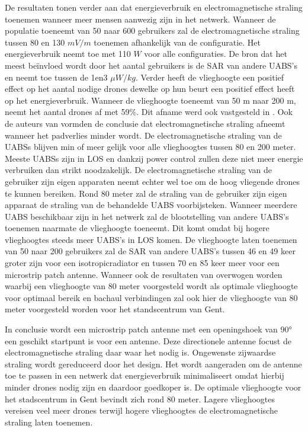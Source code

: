 \documentclass[twocolumn]{phdsymp_dutch}
\begin{document}
De resultaten tonen verder aan dat energieverbruik en electromagnetische straling toenemen wanneer 
meer mensen aanwezig zijn in het netwerk. Wanneer de populatie toeneemt van 50 naar 600 gebruikers 
zal de electromagnetische straling tussen 80 en 130 $mV/m$ toenemen afhankelijk van de configuratie.
Het energieverbruik neemt toe met 110 $W$ voor alle configuraties.
De bron dat het meest be\"invloed wordt  door het aantal gebruikers is de \gls{SAR} van andere \gls{UABS}'s 
en neemt toe tussen de 1en3 $\mu W/kg$. 
Verder heeft de vlieghoogte een positief effect op het aantal nodige drones dewelke op hun beurt een positief 
effect heeft op het energieverbruik. Wanneer de vlieghoogte toeneemt van 50 m naar 200 m, neemt het aantal 
drones af met 59\%. Dit afname werd ook vastgesteld in \cite{J2}.
Ook de auteurs van \cite{J17_kuehn2019modelling} vormden de conclusie dat electromagnetische straling afneemt wanneer 
het padverlies minder wordt.
De electromagnetische straling van de  \gls{UABS}s blijven min of meer gelijk voor alle vlieghoogtes tussen 80 en 200 meter. 
Meeste \gls{UABS}s zijn in \gls{LOS} en dankzij power control zullen deze niet meer energie verbruiken dan strikt noodzakelijk.
De electromagnetische straling van de gebruiker zijn eigen apparaten neemt echter wel toe om de hoog vliegende drones te kunnen bereiken.
Rond 80 meter zal de straling van de gebruiker zijn eigen apparaat de straling van de behandelde \gls{UABS} voorbijsteken.
Wanneer meerdere \gls{UABS} beschikbaar zijn in het netwerk zal de blootstelling van andere \gls{UABS}'s toenemen 
naarmate de vlieghoogte toeneemt. Dit komt omdat bij hogere vlieghoogtes steeds meer \gls{UABS}'s in \gls{LOS} komen.
De vlieghoogte laten toenemen van 50 naar 200 gebruikers zal de 
 \gls{SAR} van andere \gls{UABS}'s tussen 46 en 49 keer groter zijn voor een \gls{isotropicradiator} en  tussen
  70 en 85 keer meer voor een microstrip patch antenne.
Wanneer ook de resultaten van \cite{U1} overwogen worden waarbij een vlieghoogte van 80 meter voorgesteld wordt als optimale 
vlieghoogte  voor optimaal bereik en bachaul verbindingen zal ook hier de vlieghoogte van 80 meter voorgesteld worden 
voor het standscentrum van Gent.

In conclusie wordt een microstrip patch antenne
met een openingshoek van \ang{90} een geschikt startpunt is voor een antenne.
Deze directionele  antenne focust de electromagnetische straling daar waar het nodig is.
Ongewenste zijwaardse straling wordt gereduceerd door het design.
Het wordt aangeraden om de antenne toe te passen in een netwerk dat energieverbruik minimaliseert
omdat hierbij minder drones nodig zijn en daardoor goedkoper is.
De optimale vlieghoogte voor het stadscentrum in Gent bevindt zich rond 80  meter.
Lagere vlieghoogtes vereisen veel meer drones terwijl hogere vlieghoogtes de 
electromagnetische straling laten toenemen.
\end{document}
